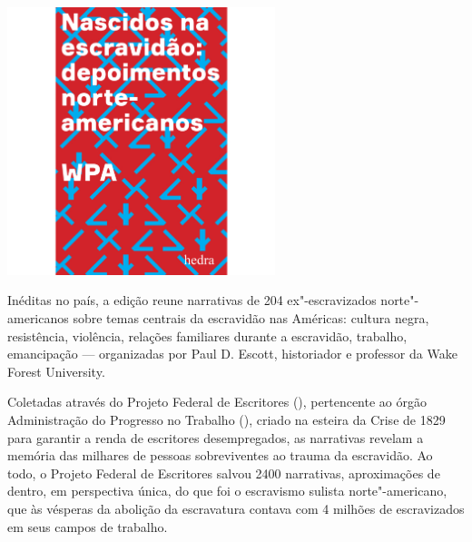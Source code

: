 \pagebreak

\begin{center}
\hspace*{-3.5cm}
\hspace*{3cm}\includegraphics[width=78mm]{./grid/wpa.jpg}
\end{center}

\hspace*{-7cm}\hrulefill\hspace*{-7cm}

\medskip

\noindent{}Inéditas no país, a edição reune narrativas de 204 ex"-escravizados norte"-americanos sobre temas centrais da escravidão nas Américas: cultura negra, resistência, violência, relações familiares durante a escravidão, trabalho, emancipação --- organizadas por Paul D. Escott, historiador e professor da Wake Forest University.

Coletadas através do Projeto Federal de Escritores (), pertencente ao órgão Administração do Progresso no Trabalho (), criado na esteira da Crise de 1829 para garantir a renda de escritores desempregados, as narrativas revelam a memória das milhares de pessoas sobreviventes ao trauma da escravidão. Ao todo, o Projeto Federal de Escritores salvou 2400 narrativas, aproximações de dentro, em perspectiva única, do que foi o escravismo sulista norte"-americano, que às vésperas da abolição da escravatura contava com 4 milhões de escravizados em seus campos de trabalho.

\vfill

\hspace*{-.4cm}\begin{minipage}[c]{.6\linewidth}
\small{
{}}
\end{minipage}


